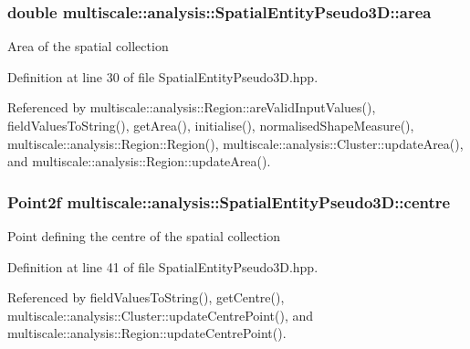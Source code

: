 \hypertarget{classmultiscale_1_1analysis_1_1SpatialEntityPseudo3D_a1621d5b3ece663bf4c5501940e860292}{
\subsubsection[{area}]{\setlength{\rightskip}{0pt plus 5cm}double multiscale\-::analysis\-::\-Spatial\-Entity\-Pseudo3\-D\-::area\hspace{0.3cm}{\ttfamily [protected]}}}\label{classmultiscale_1_1analysis_1_1SpatialEntityPseudo3D_a1621d5b3ece663bf4c5501940e860292}
Area of the spatial collection 

Definition at line 30 of file Spatial\-Entity\-Pseudo3\-D.\-hpp.



Referenced by multiscale\-::analysis\-::\-Region\-::are\-Valid\-Input\-Values(), field\-Values\-To\-String(), get\-Area(), initialise(), normalised\-Shape\-Measure(), multiscale\-::analysis\-::\-Region\-::\-Region(), multiscale\-::analysis\-::\-Cluster\-::update\-Area(), and multiscale\-::analysis\-::\-Region\-::update\-Area().

\hypertarget{classmultiscale_1_1analysis_1_1SpatialEntityPseudo3D_a647c25f9544d5537938bbadefc436634}{
\subsubsection[{centre}]{\setlength{\rightskip}{0pt plus 5cm}Point2f multiscale\-::analysis\-::\-Spatial\-Entity\-Pseudo3\-D\-::centre\hspace{0.3cm}{\ttfamily [protected]}}}\label{classmultiscale_1_1analysis_1_1SpatialEntityPseudo3D_a647c25f9544d5537938bbadefc436634}
Point defining the centre of the spatial collection 

Definition at line 41 of file Spatial\-Entity\-Pseudo3\-D.\-hpp.



Referenced by field\-Values\-To\-String(), get\-Centre(), multiscale\-::analysis\-::\-Cluster\-::update\-Centre\-Point(), and multiscale\-::analysis\-::\-Region\-::update\-Centre\-Point().

